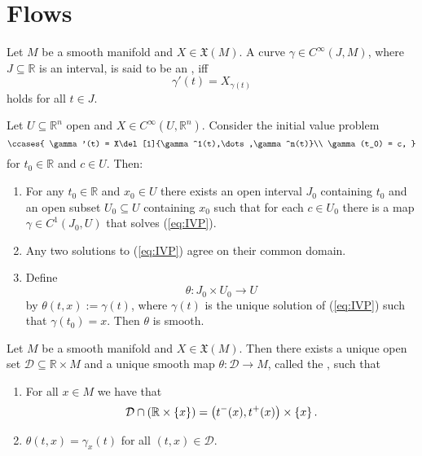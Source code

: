 \section*{Flows}

\begin{definition}
	Let $M$ be a smooth manifold and $X \in \mathfrak{X}(M)$. A curve $\gamma \in C^\infty(J,M)$, where $J \subseteq \mathbb{R}$ is an interval, is said to be an , iff 
	\begin{equation*}
		\gamma'(t) = X_{\gamma(t)}
	\end{equation*}
	\noindent holds for all $t \in J$.
\end{definition}

\begin{proposition}
	Let $U \subseteq \mathbb{R}^n$ open and $X \in C^\infty(U,\mathbb{R}^n)$. Consider the initial value problem
	\begin{equation}
		\label{eq:IVP}
		\ccases{
			\gamma'(t) = X\del[1]{\gamma^1(t),\dots,\gamma^n(t)}\\
			\gamma(t_0) = c,
		}
	\end{equation}
	\noindent for  $t_0 \in \mathbb{R}$ and $c \in U$. Then:
	\begin{enumerate}[label = \textup{(\alph*)},leftmargin=*]
		\item For any $t_0 \in \mathbb{R}$ and $x_0 \in U$ there exists an open interval $J_0$ containing $t_0$ and an open subset $U_0 \subseteq U$ containing $x_0$ such that for each $c \in U_0$ there is a map $\gamma \in C^1(J_0,U)$ that solves \textup{(\ref{eq:IVP})}.
		\item Any two solutions to \textup{(\ref{eq:IVP})} agree on their common domain.
		\item Define 
			\begin{equation*}
				\theta : J_0 \times U_0 \to U
			\end{equation*}
			\noindent by $\theta(t,x) := \gamma(t)$, where $\gamma(t)$ is the unique solution of \textup{(\ref{eq:IVP})} such that $\gamma(t_0) = x$. Then $\theta$ is smooth.
	\end{enumerate}
\end{proposition}

\begin{theorem}
	Let $M$ be a smooth manifold and $X \in \mathfrak{X}(M)$. Then there exists a unique open set $\mathcal{D} \subseteq \mathbb{R} \times M$ and a unique smooth map $\theta : \mathcal{D} \to M$, called the , such that
	\begin{enumerate}[label=\textup{(\alph*)},leftmargin=*]
		\item For all $x \in M$ we have that
			\begin{equation*}
				\mathcal{D} \cap (\mathbb{R} \times \cbr{x}) = \intoo[1]{t^-(x),t^+(x)} \times \cbr{x}.
			\end{equation*}
		\item $\theta(t,x) = \gamma_x(t)$ for all $(t,x) \in \mathcal{D}$.
	\end{enumerate}
\end{theorem}

